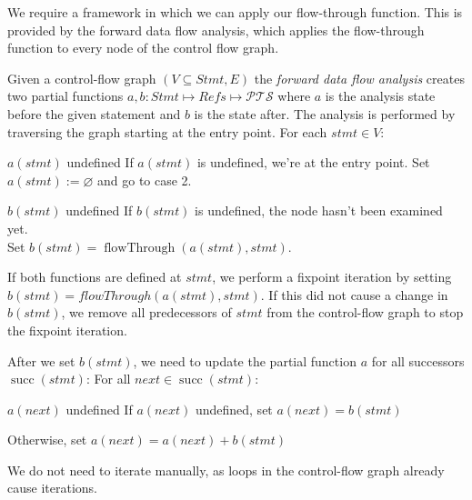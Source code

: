 We require a framework in which we can apply our flow-through function. This is provided by the forward data flow analysis, which applies the flow-through function to every node of the control flow graph.
\begin{algorithm}
\label{def:fdfa}
Given a control-flow graph $(V \subseteq \mathit{Stmt},E)$ the \emph{forward data flow analysis} creates two partial functions $a, b : \mathit{Stmt} \mapsto \mathit{Refs} \mapsto \mathcal{PTS}$ where $a$ is the analysis state before the given statement and $b$ is the state after. The analysis is performed by traversing the graph starting at the entry point. For each $\mathit{stmt} \in V$:
\begin{case}
    \item[$a(\mathit{stmt})$ undefined] If $a(\mathit{stmt})$ is undefined, we're at the entry point. Set $a(\mathit{stmt}) := \varnothing$ and go to case 2.
    \item[$b(\mathit{stmt})$ undefined] If $b(\mathit{stmt})$ is undefined, the node hasn't been examined yet. \\Set $b(\mathit{stmt}) = \operatorname{flowThrough}(a(\mathit{stmt}), stmt)$.
    \item If both functions are defined at $\mathit{stmt}$, we perform a fixpoint iteration by setting $b(\mathit{stmt}) = flowThrough(a(\mathit{stmt}),\mathit{stmt})$. If this did not cause a change in $b(\mathit{stmt})$, we remove all predecessors of $\mathit{stmt}$ from the control-flow graph to stop the fixpoint iteration.
\end{case}

After we set $b(\mathit{stmt})$, we need to update the partial function $a$ for all successors $\operatorname{succ}(\mathit{stmt})$: For all $\mathit{next} \in \operatorname{succ}(\mathit{stmt})$:
\begin{case}
    \item[$a(\mathit{next})$ undefined] If $a(\mathit{next})$ undefined, set $a(\mathit{next}) = b(\mathit{stmt})$
    \item Otherwise, set $a(\mathit{next}) = a(\mathit{next}) + b(\mathit{stmt})$
\end{case}
We do not need to iterate manually, as loops in the control-flow graph already cause iterations.
\end{algorithm}
